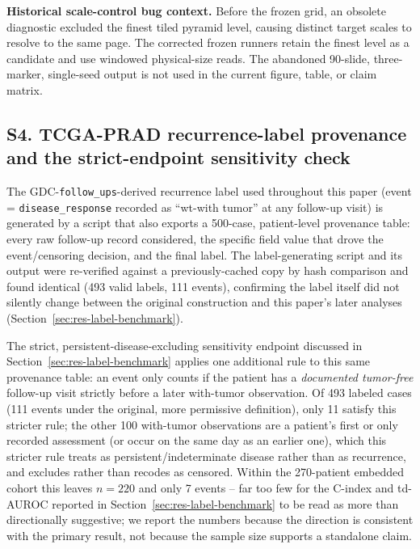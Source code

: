 \textbf{Historical scale-control bug context.} Before the frozen grid, an obsolete diagnostic
excluded the finest tiled pyramid level, causing distinct target scales to resolve to the same
page. The corrected frozen runners retain the finest level as a candidate and use windowed
physical-size reads. The abandoned 90-slide, three-marker, single-seed output is not used in
the current figure, table, or claim matrix.

\subsection*{S4. TCGA-PRAD recurrence-label provenance and the strict-endpoint sensitivity check}

The GDC-\texttt{follow\_ups}-derived recurrence label used throughout this paper (event =
\texttt{disease\_response} recorded as ``wt-with tumor'' at any follow-up visit) is generated by
a script that also exports a 500-case, patient-level provenance table: every raw follow-up
record considered, the specific field value that drove the event/censoring decision, and the
final label. The label-generating script and its output were re-verified against a
previously-cached copy by hash comparison and found identical (493 valid labels, 111 events),
confirming the label itself did not silently change between the original construction and this
paper's later analyses (Section~\ref{sec:res-label-benchmark}).

The strict, persistent-disease-excluding sensitivity endpoint discussed in
Section~\ref{sec:res-label-benchmark} applies one additional rule to this same provenance
table: an event only counts if the patient has a \emph{documented tumor-free} follow-up visit
strictly before a later with-tumor observation. Of 493 labeled cases (111 events under the
original, more permissive definition), only 11 satisfy this stricter rule; the other 100
with-tumor observations are a patient's first or only recorded assessment (or occur on the same
day as an earlier one), which this stricter rule treats as persistent/indeterminate disease
rather than as recurrence, and excludes rather than recodes as censored. Within the 270-patient
embedded cohort this leaves $n=220$ and only 7 events -- far too few for the C-index and
td-AUROC reported in Section~\ref{sec:res-label-benchmark} to be read as more than directionally
suggestive; we report the numbers because the direction is consistent with the primary result,
not because the sample size supports a standalone claim.

